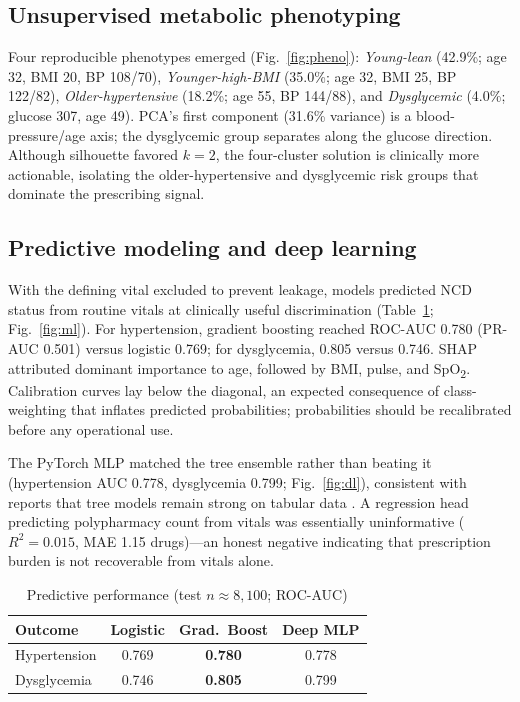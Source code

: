 \documentclass[conference]{IEEEtran}
\begin{document}
\subsection{Unsupervised metabolic phenotyping}
Four reproducible phenotypes emerged (Fig.~\ref{fig:pheno}): \emph{Young-lean} (42.9\%; age 32, BMI 20, BP 108/70), \emph{Younger-high-BMI} (35.0\%; age 32, BMI 25, BP 122/82), \emph{Older-hypertensive} (18.2\%; age 55, BP 144/88), and \emph{Dysglycemic} (4.0\%; glucose 307, age 49). PCA's first component (31.6\% variance) is a blood-pressure/age axis; the dysglycemic group separates along the glucose direction. Although silhouette favored $k{=}2$, the four-cluster solution is clinically more actionable, isolating the older-hypertensive and dysglycemic risk groups that dominate the prescribing signal.

\subsection{Predictive modeling and deep learning}
With the defining vital excluded to prevent leakage, models predicted NCD status from routine vitals at clinically useful discrimination (Table~\ref{tab:ml}; Fig.~\ref{fig:ml}). For hypertension, gradient boosting reached ROC-AUC 0.780 (PR-AUC 0.501) versus logistic 0.769; for dysglycemia, 0.805 versus 0.746. SHAP attributed dominant importance to age, followed by BMI, pulse, and SpO\textsubscript{2}. Calibration curves lay below the diagonal, an expected consequence of class-weighting that inflates predicted probabilities; probabilities should be recalibrated before any operational use.

The PyTorch MLP matched the tree ensemble rather than beating it (hypertension AUC 0.778, dysglycemia 0.799; Fig.~\ref{fig:dl}), consistent with reports that tree models remain strong on tabular data \cite{grinsztajn2022why}. A regression head predicting polypharmacy count from vitals was essentially uninformative ($R^2{=}0.015$, MAE 1.15 drugs)---an honest negative indicating that prescription burden is not recoverable from vitals alone.

\begin{table}[t]
\caption{Predictive performance (test $n\approx8{,}100$; ROC-AUC)}
\label{tab:ml}
\centering
\small
\begin{tabular}{@{}lccc@{}}
\toprule
Outcome & Logistic & Grad.\ Boost & Deep MLP \\
\midrule
Hypertension & 0.769 & \textbf{0.780} & 0.778 \\
Dysglycemia & 0.746 & \textbf{0.805} & 0.799 \\
\bottomrule
\end{tabular}
\end{table}
\end{document}
